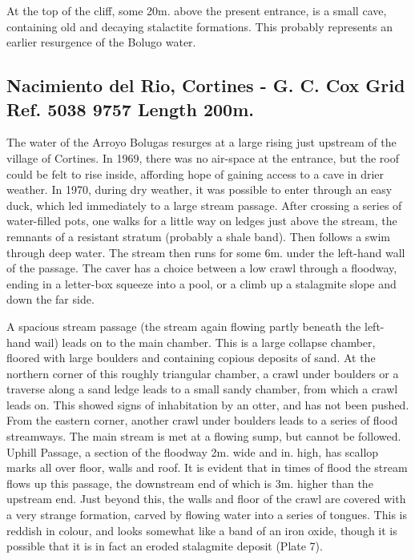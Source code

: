 \documentclass[11pt, a4paper, twoside]{memoir}
\begin{document}
At the top of the cliff, some 20m. above the present entrance, is a small cave, containing old and decaying stalactite formations. This probably represents an earlier resurgence of the Bolugo water.


\subsection*{Nacimiento del Rio, Cortines - G. C. Cox Grid Ref. 5038 9757 Length 200m.}

The water of the Arroyo Bolugas resurges at a large rising just upstream of the village of Cortines. In 1969, there was no air-space at the entrance, but the roof could be felt to rise inside, affording hope of gaining access to a cave in drier weather. In 1970, during dry weather, it was possible to enter through an easy duck, which led immediately to a large stream passage. After crossing a series of water-filled pots, one walks for a little way on ledges just above the stream, the remnants of a resistant stratum (probably a shale band). Then follows a swim through deep water. The stream then runs for some 6m. under the left-hand wall of the passage. The caver has a choice between a low crawl through a floodway, ending in a letter-box squeeze into a pool, or a climb up a stalagmite slope and down the far side.

A spacious stream passage (the stream again flowing partly beneath the left- hand wail) leads on to the main chamber. This is a large collapse chamber, floored with large boulders and containing copious deposits of sand. At the northern corner of this roughly triangular chamber, a crawl under boulders or a traverse along a sand ledge leads to a small sandy chamber, from which a crawl leads on. This showed signs of inhabitation by an otter, and has not been pushed. From the eastern corner, another crawl under boulders leads to a series of flood streamways. The main stream is met at a flowing sump, but cannot be followed. Uphill Passage, a section of the floodway 2m. wide and in. high, has scallop marks all over floor, walls and roof. It is evident that in times of flood the stream flows up this passage, the downstream end of which is 3m. higher than the upstream end. Just beyond this, the walls and floor of the crawl are covered with a very strange formation, carved by flowing water into a series of tongues. This is reddish in colour, and looks somewhat like a band of an iron oxide, though it is possible that it is in fact an eroded stalagmite deposit (Plate 7).
\end{document}
